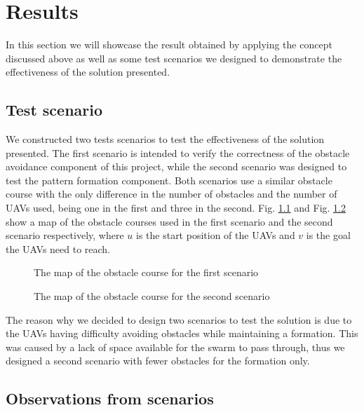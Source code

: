 \chapter{Results}

In this section we will showcase the result obtained by applying the concept discussed above as well as some test
scenarios we designed to demonstrate the effectiveness of the solution presented. 

\section{Test scenario}

We constructed two tests scenarios to test the effectiveness of the solution presented. The first scenario is intended
to verify the correctness of the obstacle avoidance component of this project, while the second scenario
was designed to test the pattern formation component. Both scenarios use a similar obstacle course with the only
difference in the number of obstacles and the number of UAVs used, being one in the first and three in the second.
Fig. \ref{fig:sc-1} and Fig. \ref{fig:sc-2} show a map of the obstacle courses used in the first scenario and the second scenario respectively,
where $u$ is the start position of the UAVs and $v$ is the goal the UAVs need to reach.

\begin{figure}
	\begin{center}
		
	\end{center}
	\caption{The map of the obstacle course for the first scenario}\label{fig:sc-1}
\end{figure}

\begin{figure}
	\begin{center}
		
	\end{center}
	\caption{The map of the obstacle course for the second scenario}\label{fig:sc-2}
\end{figure}

The reason why we decided to design two scenarios to test the solution is due to the UAVs having
difficulty avoiding obstacles while maintaining a formation. This was caused by a lack of space
available for the swarm to pass through, thus we designed a second scenario with fewer obstacles for 
the formation only.

\section{Observations from scenarios}

